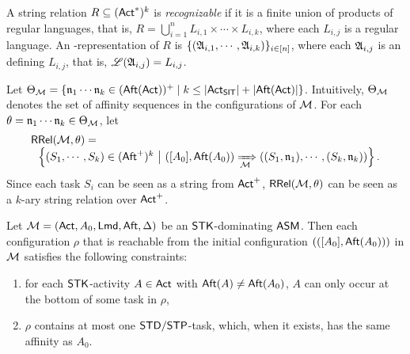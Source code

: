 \begin{definition}
A string relation $R \subseteq ({\sf Act}^*)^k$ is \emph{recognizable}  if it is a finite union of products of regular languages, that is, $R=\bigcup \limits_{i =1 }^n L_{i,1} \times \cdots \times L_{i, k}$, where each $L_{i,j}$ is a regular language. An {\NFA}-representation of $R$ is $\{({\mathfrak{A} }_{i,1},\cdots,{\mathfrak{A} }_{i,k})\}_{i\in[n]}$, where each ${\mathfrak{A} }_{i,j}$ is an {\NFA} defining $L_{i,j}$, that is, ${\mathscr{L} }({\mathfrak{A} }_{i,j}) = L_{i,j}$.
\end{definition}


Let $\Theta_{\mathcal{M} } = \left \{ \mathfrak{n}_1 \cdots \mathfrak{n}_k \in ({\sf Aft}({\sf Act}))^+ \mid k \le |{\sf Act}_{{\sf SIT}}| + |{\sf Aft}({\sf Act})| \right\}$. Intuitively, $\Theta_{\mathcal{M} }$ denotes the set of affinity sequences  in the configurations of ${\mathcal{M} }$. For each $\theta=\mathfrak{n}_1 \cdots \mathfrak{n}_k \in \Theta_{\mathcal{M} }$, let
%
$$
\begin{array}{l}
\mathsf{RRel}({\mathcal{M} }, \theta) = \\
\ \ \left\{(S_1, \cdots, S_k) \in ({\sf Aft}^+)^k\ \big{\vert}\  ([A_0], {\sf Aft}(A_0)) \xRightarrow[{\mathcal{M} }]{} ((S_1, \mathfrak{n}_1), \cdots, (S_k, \mathfrak{n}_k)) \right\}.
\end{array}
$$ 
%
Since each task $S_i$ can be seen as a string from ${\sf Act}^+$, $\mathsf{RRel}({\mathcal{M} }, \theta)$ can be seen as a $k$-ary string relation over ${\sf Act}^+$. 


\begin{proposition}\label{prop-stk}
	Let ${\mathcal{M} }=({\sf Act},A_0,{\sf Lmd},{\sf Aft},\Delta)$ be an $\mathsf{STK}$-dominating $\textsf{ASM}$. Then each configuration $\rho$ that is reachable from the initial configuration $(([A_0],{\sf Aft}(A_0)))$ in ${\mathcal{M} }$ satisfies the following constraints:
	\begin{enumerate}
		\item for each $\mathsf{STK}$-activity $A\in{\sf Act}$ with ${\sf Aft}(A)\neq{\sf Aft}(A_0)$, $A$ can only occur at the bottom of some task in $\rho$, 
		\item $\rho$ contains at most one ${\sf STD}/{\sf STP}$-task, which, when it exists, has the same affinity as $A_0$.
	\end{enumerate}
\end{proposition}



